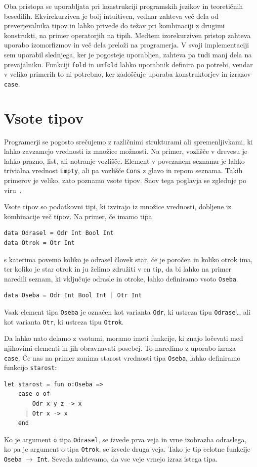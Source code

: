 \documentclass[a4paper,12pt,openright]{book}
\begin{document}
Oba pristopa se uporabljata pri konstrukciji programskih jezikov in teoretičnih besedilih. Ekvirekurziven je bolj intuitiven, vednar zahteva več dela od preverjevalnika tipov in 
lahko privede do težav pri kombinaciji z drugimi konstrukti, na primer operatorjih na tipih. Medtem izorekurziven pristop zahteva uporabo izomorfizmov in več dela preloži na programerja. 
V svoji implementaciji sem uporabil slednjega, ker je pogosteje uporabljen, zahteva pa tudi manj dela na prevajalniku. Funkciji \lstinline{fold} in \lstinline{unfold} lahko uporabnik definira po potrebi, 
vendar v veliko primerih to ni potrebno, ker zadoščuje uporaba konstruktorjev in izrazov \lstinline{case}.

\chapter{Vsote tipov}
Programerji se pogosto srečujemo z različnimi strukturami ali spremenljivkami, ki lahko zavzamejo vrednosti iz množice možnosti. Na primer, vozlišče v drevesu je lahko prazno, list, ali 
notranje vozlišče. Element v povezanem seznamu je lahko trivialna vrednost \lstinline{Empty}, ali pa vozlišče \lstinline{Cons} z glavo in repom seznama. Takih primerov je veliko, zato poznamo vsote tipov. 
Snov tega poglavja se zgleduje po viru~\cite{Pie02}.

Vsote tipov so podatkovni tipi, ki izvirajo iz množice vrednosti, dobljene iz kombinacije več tipov. Na primer, če imamo tipa
\begin{lstlisting}
data Odrasel = Odr Int Bool Int
data Otrok = Otr Int
\end{lstlisting}
s katerima povemo koliko je odrasel človek star, če je poročen in koliko otrok ima, ter koliko je star otrok in ju želimo združiti v en tip, da bi lahko na primer naredili seznam, ki vključuje odrasle in otroke, lahko definiramo vsoto \lstinline{Oseba}.
\begin{lstlisting}
data Oseba = Odr Int Bool Int | Otr Int
\end{lstlisting}
Vsak element tipa \lstinline{Oseba} je označen kot varianta \lstinline{Odr}, ki ustreza tipu \lstinline{Odrasel}, ali kot varianta \lstinline{Otr}, ki ustreza tipu \lstinline{Otrok}.

Da lahko nato delamo z vsotami, moramo imeti funkcije, ki znajo ločevati med njihovimi elementi in jih obravnavati posebej. To naredimo z uporabo izraza \lstinline{case}. Če nas na primer zanima 
starost vrednosti tipa \lstinline{Oseba}, lahko definiramo funkcijo \lstinline{starost}:
\begin{lstlisting}
let starost = fun o:Oseba =>
    case o of
        Odr x y z -> x
      | Otr x -> x
    end
\end{lstlisting}
Ko je argument \lstinline{o} tipa \lstinline{Odrasel}, se izvede prva veja in vrne izobrazba odraslega, ko pa je argument o tipa \lstinline{Otrok}, se izvede druga veja. Tako je tip celotne funkcije 
\lstinline{Oseba} $\rightarrow$ \lstinline{Int}. Seveda zahtevamo, da vse veje vrnejo izraz istega tipa.
\end{document}

